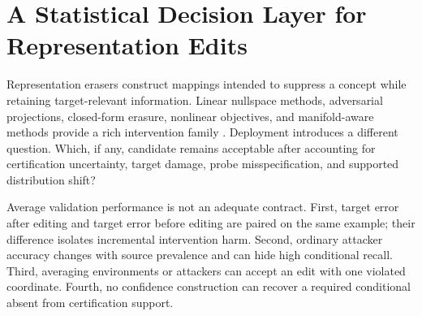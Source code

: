 \begin{abstract}
We study a statistical deployment decision for representation interventions.
Given finitely many edits and certification evidence, the procedure must certify
one edit or abstain when deployment may reweight supported environment- and
source-conditional laws. VERA represents paired target harm and recovery by a
portfolio of retrained attackers as a vector of bounded contracts. It combines
candidate-wise intersection--union testing with simultaneous robust-risk curves
to report an anisotropic shift envelope, its limiting common radius, and every
unsupported coordinate. We prove fixed-profile and post-inspection validity,
derive exact curves for Bernoulli recovery and ternary paired harm, formulate a
convex minimax allocation for additive multi-cell contracts, and give an
exact-KL evidence lower bound for independent Bernoulli components with locally
matching margin and shift scaling. A
two-world theorem shows that required support absent from certification is not
certifiable without further assumptions. Learn Then Test supplies the finite-
family testing mechanism; the contribution is the intervention-specific
population object, evidence design, and support boundary. A prior IID study
found 35/128 violations for validation-only selection and 1/128 for fixed-
profile certification, but does not establish shift robustness.
\ControlledShiftAbstractResult
\end{abstract}

\section{A Statistical Decision Layer for Representation Edits}
\label{neurips:sec:intro}

Representation erasers construct mappings intended to suppress a concept while
retaining target-relevant information. Linear nullspace methods, adversarial
projections, closed-form erasure, nonlinear objectives, and manifold-aware
methods provide a rich intervention family
\cite{ravfogel2020null,ravfogel2022linear,belrose2023leace,ravfogel2022kernel,jourdan2023taco,holstege2025splince,avitan2026mance}.
Deployment introduces a different question. Which, if any, candidate remains
acceptable after accounting for certification uncertainty, target damage, probe
misspecification, and supported distribution shift?

Average validation performance is not an adequate contract. First, target
error after editing and target error before editing are paired on the same
example; their difference isolates incremental intervention harm. Second,
ordinary attacker accuracy changes with source prevalence and can hide high
conditional recall. Third, averaging environments or attackers can accept an
edit with one violated coordinate. Fourth, no confidence construction can
recover a required conditional absent from certification support.

